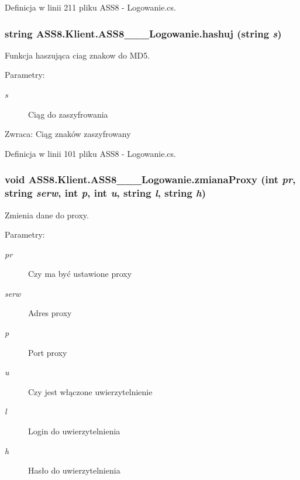 Definicja w linii 211 pliku ASS8 - Logowanie.cs.\hypertarget{a00001_0041d09c2fd476393f8e19fd263676a9}{
\subsubsection[{hashuj}]{\setlength{\rightskip}{0pt plus 5cm}string ASS8.Klient.ASS8\_\-\_\-\_\-Logowanie.hashuj (string {\em s})}}
\label{d8/d84/a00001_0041d09c2fd476393f8e19fd263676a9}


Funkcja haszująca ciag znakow do MD5. 

\begin{Desc}
\item[Parametry:]
\begin{description}
\item[{\em s}]Ciąg do zaszyfrowania\end{description}
\end{Desc}
\begin{Desc}
\item[Zwraca:]Ciąg znaków zaszyfrowany\end{Desc}


Definicja w linii 101 pliku ASS8 - Logowanie.cs.\hypertarget{a00001_217558400fcf4848e5e455a1be4a012a}{
\subsubsection[{zmianaProxy}]{\setlength{\rightskip}{0pt plus 5cm}void ASS8.Klient.ASS8\_\-\_\-\_\-Logowanie.zmianaProxy (int {\em pr}, \/  string {\em serw}, \/  int {\em p}, \/  int {\em u}, \/  string {\em l}, \/  string {\em h})}}
\label{d8/d84/a00001_217558400fcf4848e5e455a1be4a012a}


Zmienia dane do proxy. 

\begin{Desc}
\item[Parametry:]
\begin{description}
\item[{\em pr}]Czy ma być ustawione proxy\item[{\em serw}]Adres proxy\item[{\em p}]Port proxy\item[{\em u}]Czy jest włączone uwierzytelnienie\item[{\em l}]Login do uwierzytelnienia\item[{\em h}]Hasło do uwierzytelnienia\end{description}
\end{Desc}


